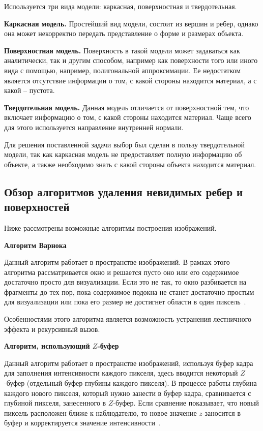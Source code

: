 Используется три вида модели: каркасная, поверхностная и твердотельная.

\textbf{Каркасная модель.} Простейший вид модели, состоит из вершин и ребер, однако она может некорректно передать представление о форме и размерах объекта.

\textbf{Поверхностная модель.} Поверхность в такой модели может задаваться как аналитически, так и другим способом, например как поверхности того или иного вида с помощью, например, полигональной аппроксимации. Ее недостатком является отсутствие информации о том, с какой стороны находится материал, а с какой -- пустота.

\textbf{Твердотельная модель.} Данная модель отличается от поверхностной тем, что включает информацию о том, с какой стороны находится материал. Чаще всего для этого используется направление внутренней нормали.

Для решения поставленной задачи выбор был сделан в пользу твердотельной модели, так как каркасная модель не предоставляет полную информацию об объекте, а также необходимо знать с какой стороны объекта находится материал.

\subsection{Обзор алгоритмов удаления невидимых ребер и поверхностей}
Ниже рассмотрены возможные алгоритмы построения изображений.

\textbf{Алгоритм Варнока}

Данный алгоритм работает в пространстве изображений. В рамках этого алгоритма рассматривается окно и решается пусто оно или его содержимое достаточно просто для визуализации. Если это не так, то окно разбивается на фрагменты до тех пор, пока содержимое подокна не станет достаточно простым для визуализации или пока его размер не достигнет области в один пиксель~\cite{rodgers}.

Особенностями этого алгоритма является возможность устранения лестничного эффекта и рекурсивный вызов.

\textbf{Алгоритм, использующий $Z$-буфер}

Данный алгоритм работает в пространстве изображений, используя буфер кадра для заполнения интенсивности каждого пикселя, здесь вводится некоторый $Z$-буфер (отдельный буфер глубины каждого пикселя). 
В процессе работы глубина каждого нового пикселя, который нужно занести в буфер кадра, сравнивается с глубиной пикселя, занесенного в $Z$-буфер. Если сравнение показывает, что новый пиксель расположен ближе к наблюдателю, то новое значение $z$ заносится в буфер и корректируется значение интенсивности~\cite{rodgers}.


